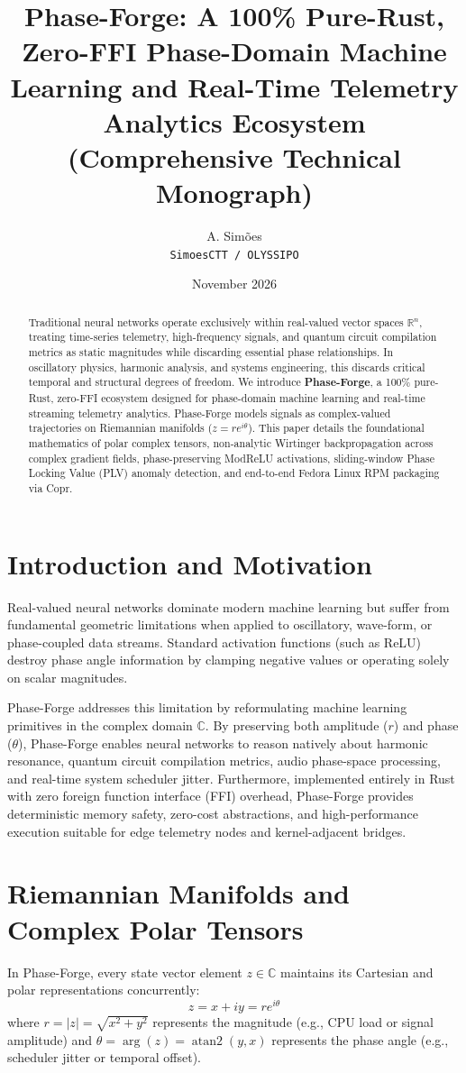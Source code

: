 \documentclass[11pt,a4paper]{article}
\title{\textbf{Phase-Forge: A 100\% Pure-Rust, Zero-FFI Phase-Domain Machine Learning and Real-Time Telemetry Analytics Ecosystem (Comprehensive Technical Monograph)}}
\author{A. Sim\~{o}es \\ \texttt{SimoesCTT / OLYSSIPO}}
\date{November 2026}
\begin{document}
\maketitle

\begin{abstract}
Traditional neural networks operate exclusively within real-valued vector spaces $\mathbb{R}^n$, treating time-series telemetry, high-frequency signals, and quantum circuit compilation metrics as static magnitudes while discarding essential phase relationships. In oscillatory physics, harmonic analysis, and systems engineering, this discards critical temporal and structural degrees of freedom. We introduce \textbf{Phase-Forge}, a 100\% pure-Rust, zero-FFI ecosystem designed for phase-domain machine learning and real-time streaming telemetry analytics. Phase-Forge models signals as complex-valued trajectories on Riemannian manifolds ($z = r e^{i\theta}$). This paper details the foundational mathematics of polar complex tensors, non-analytic Wirtinger backpropagation across complex gradient fields, phase-preserving ModReLU activations, sliding-window Phase Locking Value (PLV) anomaly detection, and end-to-end Fedora Linux RPM packaging via Copr.
\end{abstract}

\section{Introduction and Motivation}
Real-valued neural networks dominate modern machine learning but suffer from fundamental geometric limitations when applied to oscillatory, wave-form, or phase-coupled data streams. Standard activation functions (such as ReLU) destroy phase angle information by clamping negative values or operating solely on scalar magnitudes. 

Phase-Forge addresses this limitation by reformulating machine learning primitives in the complex domain $\mathbb{C}$. By preserving both amplitude ($r$) and phase ($\theta$), Phase-Forge enables neural networks to reason natively about harmonic resonance, quantum circuit compilation metrics, audio phase-space processing, and real-time system scheduler jitter. Furthermore, implemented entirely in Rust with zero foreign function interface (FFI) overhead, Phase-Forge provides deterministic memory safety, zero-cost abstractions, and high-performance execution suitable for edge telemetry nodes and kernel-adjacent bridges.

\section{Riemannian Manifolds and Complex Polar Tensors}
In Phase-Forge, every state vector element $z \in \mathbb{C}$ maintains its Cartesian and polar representations concurrently:
\begin{equation}
z = x + iy = r e^{i\theta}
\end{equation}
where $r = |z| = \sqrt{x^2 + y^2}$ represents the magnitude (e.g., CPU load or signal amplitude) and $\theta = \arg(z) = \operatorname{atan2}(y, x)$ represents the phase angle (e.g., scheduler jitter or temporal offset). 
\end{document}

